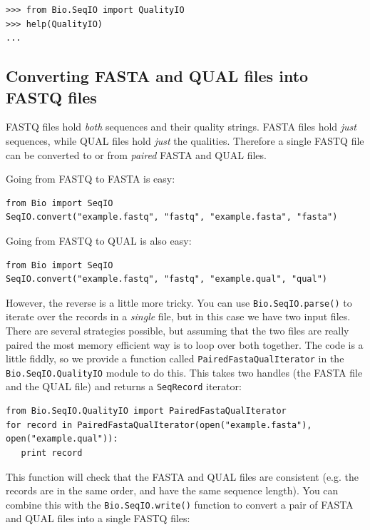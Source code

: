 \documentclass{report}
\begin{document}
\begin{verbatim}
>>> from Bio.SeqIO import QualityIO
>>> help(QualityIO)
...
\end{verbatim}

\subsection{Converting FASTA and QUAL files into FASTQ files}
\label{sec:SeqIO-fasta-qual-conversion}

FASTQ files hold \emph{both} sequences and their quality strings.
FASTA files hold \emph{just} sequences, while QUAL files hold \emph{just}
the qualities. Therefore a single FASTQ file can be converted to or from
\emph{paired} FASTA and QUAL files.

Going from FASTQ to FASTA is easy:

\begin{verbatim}
from Bio import SeqIO
SeqIO.convert("example.fastq", "fastq", "example.fasta", "fasta")
\end{verbatim}

Going from FASTQ to QUAL is also easy:

\begin{verbatim}
from Bio import SeqIO
SeqIO.convert("example.fastq", "fastq", "example.qual", "qual")
\end{verbatim}

However, the reverse is a little more tricky. You can use \verb|Bio.SeqIO.parse()|
to iterate over the records in a \emph{single} file, but in this case we have
two input files. There are several strategies possible, but assuming that the
two files are really paired the most memory efficient way is to loop over both
together. The code is a little fiddly, so we provide a function called
\verb|PairedFastaQualIterator| in the \verb|Bio.SeqIO.QualityIO| module to do
this. This takes two handles (the FASTA file and the QUAL file) and returns
a \verb|SeqRecord| iterator:

\begin{verbatim}
from Bio.SeqIO.QualityIO import PairedFastaQualIterator
for record in PairedFastaQualIterator(open("example.fasta"), open("example.qual")):
   print record
\end{verbatim}

This function will check that the FASTA and QUAL files are consistent (e.g.
the records are in the same order, and have the same sequence length).
You can combine this with the \verb|Bio.SeqIO.write()| function to convert a
pair of FASTA and QUAL files into a single FASTQ files:
\end{document}
